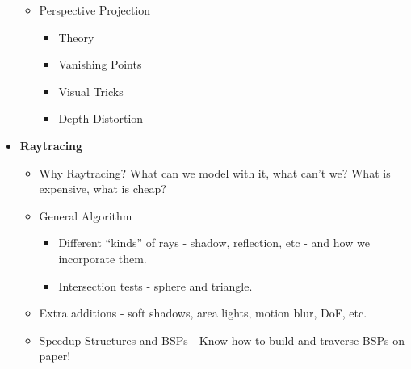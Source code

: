 \documentclass[8pt]{article}
\begin{document}
\begin{itemize}
\begin{itemize}
        \item Perspective Projection
        
        \begin{itemize}
            \item Theory
            \item Vanishing Points
            \item Visual Tricks
            \item Depth Distortion
        \end{itemize}
       
    \end{itemize}
    
    \item \textbf{Raytracing}
    
    \begin{itemize}
     
        \item Why Raytracing? What can we model with it, what can't we? What is expensive, what is cheap?
     
        \item General Algorithm
        
        \begin{itemize}
            \item Different ``kinds'' of rays - shadow, reflection, etc - and how we incorporate them.
            \item Intersection tests - sphere and triangle.
        \end{itemize}
        
        \item Extra additions - soft shadows, area lights, motion blur, DoF, etc.
        
        \item Speedup Structures and BSPs - Know how to build and traverse BSPs on paper!
       
    \end{itemize}
    
    
\end{itemize}
\end{document}

